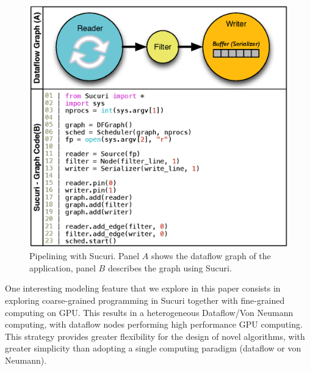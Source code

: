 \begin{figure}[htbp]
    \centering
    \includegraphics[scale=0.75]{figuras/dataflow/pipeline.eps} 
    \caption{Pipelining with Sucuri. 
    Panel $A$ shows the dataflow graph of the application, panel $B$ describes the graph using Sucuri.}
    \label{fig:pipeline}
\end{figure}

One interesting modeling feature that we explore in this paper consists in exploring coarse-grained programming in Sucuri together with fine-grained computing on GPU. This results in a heterogeneous Dataflow/Von Neumann computing, with dataflow nodes performing high performance GPU computing.
This strategy provides greater flexibility for the design of novel algorithms, with greater simplicity than adopting a single computing paradigm (dataflow or von Neumann).
